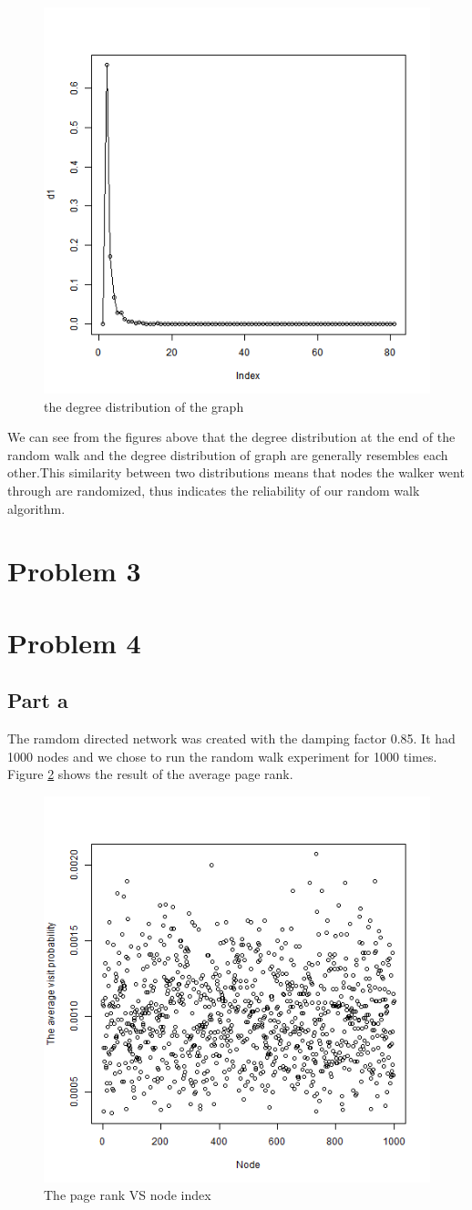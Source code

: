\documentclass{article}
\begin{document}
\begin{figure}[htbp]
\centering
\includegraphics[width=.6\textwidth]{Q2a_1.png}
\caption{the degree distribution of the graph}
\label{fig:p2_e2}
\end{figure}
\noindent We can see from the figures above that the degree distribution at the end of the random walk and the degree distribution of graph are generally resembles each other.This similarity between two distributions means that nodes the walker went through are randomized, thus indicates the reliability of our random walk algorithm.
\section{Problem 3}
\section{Problem 4}
\subsection{Part a}
The ramdom directed network was created with the damping factor 0.85. It had 1000 nodes and we chose to run the random walk experiment for 1000 times. Figure \ref{fig:p4_a} shows the result of the average page rank.
\begin{figure}[htbp]
\centering
\includegraphics[width=.6\textwidth]{p4_a.png}
\caption{The page rank VS node index}
\label{fig:p4_a}
\end{figure}
\end{document}
